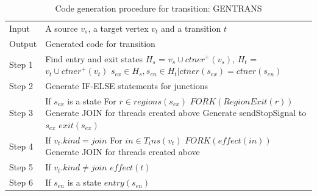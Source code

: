 	\begin{table}[]
		\centering
		\caption{Code generation procedure for transition: GENTRANS}
		\label{alg:transitiongeneration}
		\begin{tabular}{p{1cm}p{7cm}}
			\hline
			Input & A source $v_{s}$, a target vertex $v_{t}$ and a transition $t$ \\
			Output & Generated code for transition \\
			\hline
			Step 1 & Find entry and exit states \newline
			$H_s$ = $v_s \cup ctner^+(v_s)$, $H_t$ = $v_t \cup ctner^+(v_t)$ \newline $s_{ex} \in H_s, s_{en} \in H_t | ctner(s_{ex}) = ctner(s_{en})$ \\
			Step 2 & Generate IF-ELSE statements for junctions                           \\
			Step 3 & If $s_{ex}$ is a state       \newline
			         \-\hspace{0.2cm} For {$ r \in regions(s_{ex})$}  \newline 
			         \-\hspace{0.4cm} {$FORK(RegionExit(r))$} \newline
			         \-\hspace{0.2cm} {Generate JOIN for threads created above} \newline
			         \-\hspace{0.2cm} {Generate sendStopSignal to $s_{ex}$} \newline   
			         \-\hspace{0.2cm} {$exit(s_{ex})$}    \\
			Step 4 & If $v_t.kind=join$ \newline
					\-\hspace{0.2cm} For {$in \in T_ins(v_t)$} \newline
					\-\hspace{0.4cm} {$FORK(effect(in))$} \newline
					\-\hspace{0.2cm} {Generate JOIN for threads created above}
					                    \\
			Step 5 & If $v_t.kind \not=join$ \newline   
					\-\hspace{0.2cm} {$effect(t)$}                        \\
			Step 6 & If $s_{en}$ is a state \newline
					\-\hspace{0.2cm}   {$entry(s_{en})$} \newline

\end{tabular}
\end{table}
